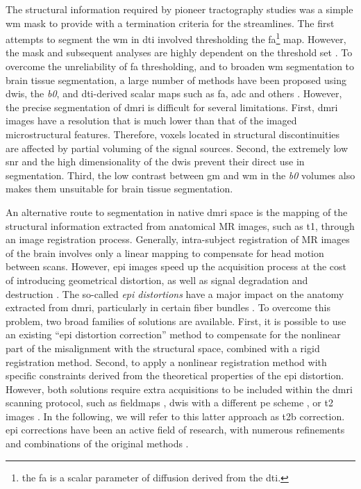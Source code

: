 \documentclass[3p,authoryear,fleqn]{elsarticle}
\providecommand{\lowb}{\textit{b0}}
\begin{document}
The structural information required by pioneer tractography studies was a simple
  \gls*{wm} mask to provide with a termination criteria for the streamlines.
The first attempts to segment the \gls*{wm} in \gls*{dti} involved thresholding the
  \gls*{fa}\footnote{the \gls*{fa} is a scalar parameter of diffusion derived from
  the \gls*{dti}.} map.
However, the mask and subsequent analyses are highly dependent on the threshold set
  \citep{taoka_fractional_2009}.
To overcome the unreliability of \gls*{fa} thresholding, and to broaden
  \gls*{wm} segmentation to brain tissue segmentation, a large number of
  methods have been proposed using \glspl*{dwi}, the \lowb{}, and \gls*{dti}-derived
  scalar maps such as \gls*{fa}, \gls*{adc} and others \citep{zhukov_level_2003,
  rousson_level_2004,jonasson_segmentation_2005,liu_brain_2007,hadjiprocopis_unbiased_2005,
  lu_segmentation_2008,han_experimental_2009}.
However, the precise segmentation of \gls*{dmri} is difficult for several limitations.
First, \gls{dmri} images have a resolution that is much lower than that of the imaged
  microstructural features.
Therefore, voxels located in structural discontinuities are affected by partial
  voluming of the signal sources.
Second, the extremely low \gls*{snr} and the high dimensionality of the \glspl*{dwi} prevent
  their direct use in segmentation.
Third, the low contrast between \gls*{gm} and \gls*{wm} in the \lowb{} volumes also makes
  them unsuitable for brain tissue segmentation.

An alternative route to segmentation in native \gls*{dmri} space is the mapping of the
  structural information extracted from anatomical MR images, such as \gls*{t1}, through
  an image registration process.
Generally, intra-subject registration of MR images of the brain involves only a linear
  mapping to compensate for head motion between scans.
However, \gls*{epi} images speed up the acquisition process at the cost of introducing geometrical
  distortion, as well as signal degradation and destruction \citep{jezzard_correction_1995}.
The so-called \emph{\gls*{epi} distortions} have a major impact on the anatomy extracted
  from \gls*{dmri}, particularly in certain fiber bundles \citep{irfanoglu_effects_2012}.
To overcome this problem, two broad families of solutions are available.
First, it is possible to use an existing ``\gls*{epi} distortion correction''
  method to compensate for the nonlinear part of the misalignment with the structural space,
  combined with a rigid registration method.
Second, to apply a nonlinear registration method with specific constraints derived from the
  theoretical properties of the \gls*{epi} distortion.
However, both solutions require extra acquisitions to be included within the \gls*{dmri} scanning
  protocol, such as fieldmaps \citep{jezzard_correction_1995}, \glspl*{dwi} with a different
  \gls*{pe} scheme \citep{cordes_geometric_2000,chiou_simple_2000}, or \gls*{t2} images
  \citep{kybic_unwarping_2000}.
In the following, we will refer to this latter approach as \gls*{t2b} correction.
\Gls*{epi} corrections have been an active field of research, with numerous refinements and
  combinations of the original methods \citep{holland_efficient_2010,andersson_comprehensive_2012,
  irfanoglu_drbuddi_2014}.
\end{document}
